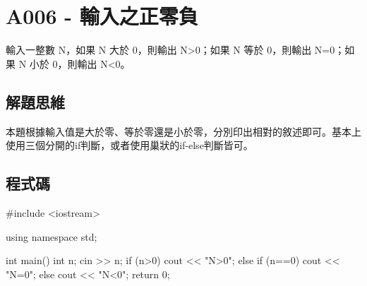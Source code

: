 \section{A006 - 輸入之正零負}
輸入一整數 N，如果 N 大於 0，則輸出 N>0；如果 N 等於 0，則輸出 N=0；如果 N 小於 0，則輸出 N<0。

\subsection{解題思維}
本題根據輸入值是大於零、等於零還是小於零，分別印出相對的敘述即可。基本上使用三個分開的if判斷，或者使用巢狀的if-else判斷皆可。
\subsection{程式碼}
\begin{cppcode}
	#include <iostream>
	
	using namespace std;
	
	int main()
	{
		int n;
		cin >> n;
		if (n>0) cout << "N>0";
		else if (n==0) cout << "N=0";
		else cout << "N<0";
		return 0;
	}
\end{cppcode}

